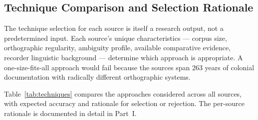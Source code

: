\subsection{Technique Comparison and Selection Rationale}
\label{sec:techniques}

The technique selection for each source is itself a research output, not a
predetermined input. Each source's unique characteristics --- corpus size,
orthographic regularity, ambiguity profile, available comparative evidence,
recorder linguistic background --- determine which approach is appropriate.
A one-size-fits-all approach would fail because the sources span 263 years
of colonial documentation with radically different orthographic systems.

Table~\ref{tab:techniques} compares the approaches considered across all
sources, with expected accuracy and rationale for selection or rejection.
The per-source rationale is documented in detail in Part~I.

